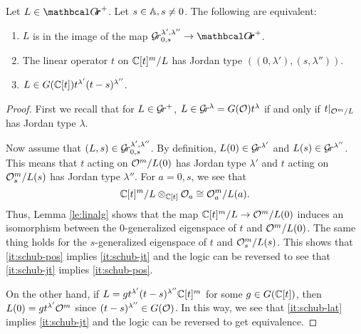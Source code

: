 \documentclass[draft]{article} %
\begin{document}
\begin{lemma} 
\label{le:Grl1l2}
    Let $ L \in \Grth^+ $.  Let $ s \in \AA, s \ne 0 $.  The following are equivalent:
    \begin{enumerate}[label=(\roman*)]
        \item \label{it:schub-pos} $ L $ is in the image of the map $ \Gr^{\lambda', \lambda''}_{0,s} \rightarrow \Grth^+$. %
        \item \label{it:schub-jt} The linear operator $ t $ on $ \CC[t]^m/L$ has Jordan type $((0,\lambda'), (s,\lambda''))$.
        \item \label{it:schub-lat} $ L \in G(\CC[t]) t^{\lambda'} (t-s)^{\lambda''}$.
    \end{enumerate}
\end{lemma}
% 
\begin{proof}
First we recall that for $ L \in \Gr^+$, $ L \in \Gr^{\lambda} = G(\cO)t^\lambda $ if and only if $ t |_{\cO^m/L} $ has Jordan type $ \lambda$. 

Now assume that $ (L, s) \in \Gr^{\lambda', \lambda''}_{0,s}$.  By definition, $ L(0) \in \Gr^{\lambda'}$ and $L(s) \in \Gr^{\lambda''} $.  This means that $t $ acting on 
$\cO^m/L(0)$ has Jordan type $ \lambda'$ and $ t$ acting on 
$\cO_s^m/L(s)$ has Jordan type $ \lambda''$.  For $ a = 0, s$,  we see that $$\CC[t]^m/L \otimes_{\CC[t]} \cO_a \cong \cO_a^m / L(a). $$
Thus, Lemma \ref{le:linalg} shows that the map
$\CC[t]^m/L\to \cO^m/L(0)$ induces an isomorphism between the $0$-generalized eigenspace of $ t$ and $ \cO^m / L(0)$.   The same thing holds for the $s$-generalized eigenspace of $t $ and $ \cO_s^m/L(s)$. This shows that \cref{it:schub-pos} implies \cref{it:schub-jt} and the logic can be reversed to see that \cref{it:schub-jt} implies \cref{it:schub-pos}. 

On the other hand, if $ L = g t^{\lambda'} (t-s)^{\lambda''} \CC[t]^m$ for some $ g \in G(\CC[t])$, then $ L(0) = g t^{\lambda'}\cO^m $ since 
$ (t-s)^{\lambda''} \in G(\cO)$. In this way, we see that \cref{it:schub-lat} implies \cref{it:schub-jt} and the logic can be reversed to get equivalence.
\end{proof}
\end{document}
